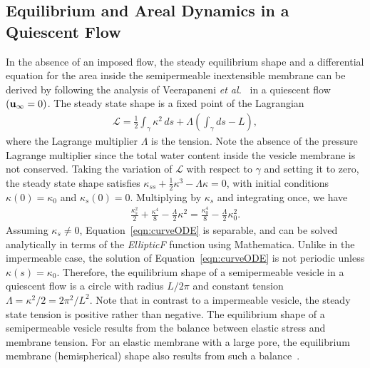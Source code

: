 \documentclass[prb,preprint,showpacs,preprintnumbers,amsmath,amssymb,longbibliography]{revtex4-1}
\begin{document}
\subsection{Equilibrium and Areal Dynamics in a Quiescent Flow\label{subsec:area_dynamics}}
In the absence of an imposed flow, the steady equilibrium shape and a
differential equation for the area inside the semipermeable inextensible membrane can be derived
by following the analysis of Veerapaneni {\em et al.}~\cite{vee-raj-bir-pur2009} in a quiescent flow $({\bf u}_{\infty} = 0)$.
%
%
The steady state shape is a
fixed point of the Lagrangian
\begin{align}
  \mathcal{L} = \frac{1}{2}\int_{\gamma} \kappa^2 \, ds +
    \Lambda \left(\int_{\gamma} ds  - L \right),
\end{align}
where the Lagrange multiplier $\Lambda$ is the tension. Note the absence
of the pressure Lagrange multiplier since the total water content inside the vesicle membrane is not conserved.
Taking the variation of $\mathcal{L}$ with respect to $\gamma$ and
setting it to zero, the steady state shape satisfies $\kappa_{ss} +
\frac{1}{2}\kappa^3 - \Lambda \kappa = 0$, with initial conditions
$\kappa(0) = \kappa_0$ and $\kappa_s(0) = 0$.  Multiplying by $\kappa_s$
and integrating once, we have
\begin{align}
  \frac{\kappa_s^2}{2} + \frac{\kappa^4}{8} - 
    \frac{\Lambda}{2}\kappa^2 = \frac{\kappa_0^4}{8} - 
    \frac{\Lambda}{2}\kappa_0^2.
  \label{eqn:curveODE}
\end{align}
Assuming $\kappa_s \neq 0$, Equation~\eqref{eqn:curveODE} is separable,
and can be solved analytically in terms of the {\em EllipticF} function
using Mathematica. Unlike in the impermeable case, the solution of
Equation~\eqref{eqn:curveODE} is not periodic unless $\kappa(s) =
\kappa_0$. Therefore, the equilibrium shape of a semipermeable vesicle
in a quiescent flow is a circle with radius $L/2\pi$ and constant
tension $\Lambda = \kappa^2/2 = 2\pi^2/L^2.$ Note that in contrast to a
impermeable vesicle, the steady state tension is positive rather than
negative. The equilibrium shape of a semipermeable vesicle results from
the balance between elastic stress and membrane tension. For an elastic
membrane with a large pore, the equilibrium membrane (hemispherical)
shape also results from such a balance~\cite{Ryham2018_JFM}.
\end{document}

